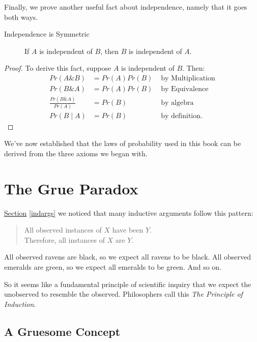 \documentclass[justified]{tufte-book}
\newcommand{\given}{\mid}
\renewcommand{\wedge}{\mathbin{\&}}
\newcommand{\p}{Pr}
\newenvironment{argument}{\begin{quote}\normalsize}{\end{quote}}
\theoremstyle{definition}
\theoremstyle{definition}
\theoremstyle{definition}
\theoremstyle{remark}
\let\BeginKnitrBlock\begin \let\EndKnitrBlock\end
\begin{document}
Finally, we prove another useful fact about independence, namely that it
goes both ways.

\begin{description}
\item[Independence is Symmetric]
If \(A\) is independent of \(B\), then \(B\) is independent of \(A\).
\end{description}

\BeginKnitrBlock{proof}
{} To derive this fact, suppose \(A\) is
independent of \(B\). Then: \[
  \begin{aligned}
    \p(A \wedge B)               &= \p(A) \p(B) & \mbox{ by Multiplication}\\
    \p(B \wedge A)               &= \p(A) \p(B) & \mbox{ by Equivalence}\\
    \frac{\p(B \wedge A)}{\p(A)} &= \p(B)       & \mbox{ by algebra}\\
    \p(B \given A)               &= \p(B)       & \mbox{ by definition.}
  \end{aligned}
\]
\EndKnitrBlock{proof}

We've now established that the laws of probability used in this book can
be derived from the three axioms we began with.

\hypertarget{grue}{%
\chapter{The Grue Paradox}\label{grue}}

 \protect\hyperlink{indargs}{Section} \ref{indargs} we
noticed that many inductive arguments follow this pattern:

\begin{argument}
All observed instances of \(X\) have been \(Y\).\\
Therefore, all instances of \(X\) are \(Y\).
\end{argument}

All observed ravens are black, so we expect all ravens to be black. All
observed emeralds are green, so we expect all emeralds to be green. And
so on.

So it seems like a fundamental principle of scientific inquiry that we
expect the unobserved to resemble the observed. Philosophers call this
\emph{The Principle of Induction}.

\hypertarget{a-gruesome-concept}{%
\section*{A Gruesome Concept}\label{a-gruesome-concept}}
\end{document}
